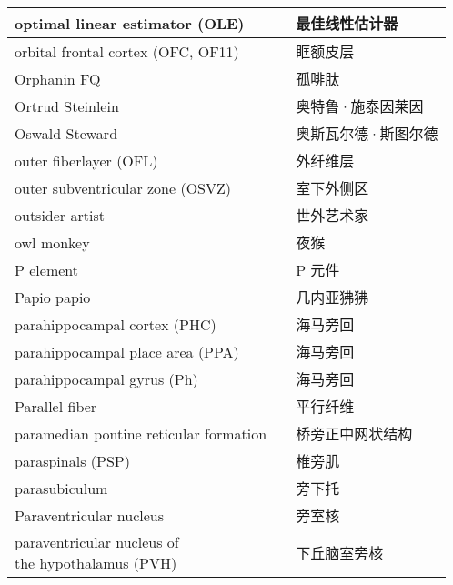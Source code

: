 \begin{longtable}{lll}
	\midrule
	optimal linear estimator (OLE)    && 最佳线性估计器   \\
	
	\midrule
	orbital frontal cortex (OFC, OF11)   && 眶额皮层 \\
	
	\midrule
	Orphanin FQ     && 孤啡肽   \\
	
	\midrule
	Ortrud Steinlein     && 奥特鲁·施泰因莱因   \\
	
	\midrule
	Oswald Steward     && 奥斯瓦尔德·斯图尔德   \\
	
	\midrule
	outer fiberlayer (OFL)     && 外纤维层   \\
	
	\midrule
	outer subventricular zone (OSVZ)     && 室下外侧区   \\
	
	\midrule
	outsider artist     && 世外艺术家   \\
	
	\midrule
	owl monkey     && 夜猴   \\
	
	\midrule
	P element  && P 元件   \\
	
	\midrule
	Papio papio  && 几内亚狒狒   \\
	
	\midrule
	parahippocampal cortex (PHC)  && 海马旁回   \\
	
	\midrule
	parahippocampal place area (PPA)  && 海马旁回   \\
	
	\midrule
	parahippocampal gyrus  (Ph)   && 海马旁回   \\
	
	\midrule
	Parallel fiber     && 平行纤维   \\
	
	\midrule
	paramedian pontine reticular formation     && 桥旁正中网状结构   \\
	
	\midrule
	paraspinals (PSP)     && 椎旁肌   \\
	
	\midrule
	parasubiculum     && 旁下托   \\
	
	\midrule
	Paraventricular nucleus     && 旁室核   \\
	
	\midrule
	\makecell{paraventricular nucleus of\\ the hypothalamus (PVH)}    && 下丘脑室旁核   \\
	

\end{longtable}
